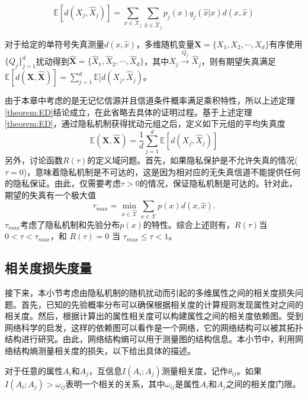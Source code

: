\begin{equation}
	\mathbb{E}[d(X_j,\hat{X}_j)]=\sum_{x\in\mathcal{X}_j}\sum_{\hat{x}\in\hat{\mathcal{X}}_j}p_{j}(x)q_j(\hat{x}|x)d(x,\hat{x})
\end{equation}

\begin{theorem}\label{theorem:ED} 对于给定的单符号失真测量$d(x,\hat{x})$，多维随机变量$\bm{X}=\{X_1,X_2,\cdots,X_d\}$有序使用$\{Q_j\}_{j=1}^{d}$扰动得到$\hat{\bm{X}}=\{\hat{X}_1,\hat{X}_2,\cdots, \hat{X}_d\}$，其中$X_j \xrightarrow{Q_j} \hat{X}_j$，则有期望失真满足$\mathbb{E}[d(\bm{X},\hat{\bm{X}})]=\sum_{j=1}^{d}\mathbb{E}[d(X_j,\hat{X}_j)$。
\end{theorem}
由于本章中考虑的是无记忆信源并且信道条件概率满足乘积特性，所以上述定理\ref{theorem:ED}结论成立，在此省略去具体的证明过程。基于上述定理\ref{theorem:ED}，通过隐私机制获得扰动元组之后，定义如下元组的平均失真度
\begin{equation}
	\mathbb{E}(\bm{X},\bm{\hat{X}})=\frac{1}{d}\sum_{j=1}^{d}\mathbb{E}[d(X_j,\hat{X}_j)]
\end{equation}
另外，讨论函数$R(\tau)$的定义域问题。首先，如果隐私保护是不允许失真的情况($\tau =0$)，意味着隐私机制是不可达的，这是因为相对应的无失真信道不能提供任何的隐私保证。由此，仅需要考虑$\tau >0$的情况，保证隐私机制是可达的。针对此，期望的失真有一个极大值
\begin{equation}
	\tau_{max}=\min_{\hat{x}\in\mathcal{\hat{X}}}\sum_{x\in\mathcal{X}}p(x)d(x,\hat{x}).
\end{equation}
$\tau_{max}$考虑了隐私机制和先验分布$p(x)$的特性。综合上述则有，$R(\tau)$当$0 < \tau < \tau_{max}$，和 $R(\tau)=0$ 当 $\tau_{max}\leq\tau<1$。

\subsection{相关度损失度量} \label{subsec:correlated_degree_loss}

接下来，本小节考虑由隐私机制的随机扰动而引起的多维属性之间的相关度损失问题。首先，已知的先验概率分布可以确保根据相关度的计算规则发现属性对之间的相关度。然后，根据计算出的属性相关度可以构建属性之间的相关度依赖图。受到网络科学的启发，这样的依赖图可以看作是一个网络，它的网络结构可以被其拓扑结构进行研究。由此，网络结构熵\cite{li2016structural}可以用于测量图的结构信息。本小节中，利用网络结构熵测量相关度的损失，以下给出具体的描述。

\begin{definition}
	对于任意的属性$A_i$和$A_j$，互信息$I(A_i; A_j)$测量相关度，记作$\theta_{ij}$。如果$I(A_i; A_j)>\omega _{ij}$表明一个相关的关系，其中$\omega _{ij}$是属性$A_i$和$A_j$之间的相关度门限。
\end{definition}

